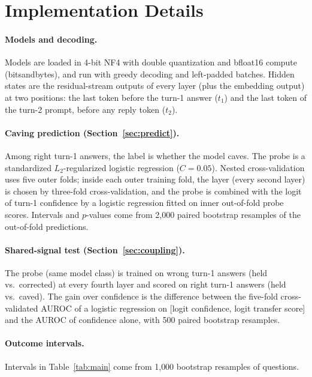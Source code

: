 \section{Implementation Details}
\label{app:impl}

\paragraph{Models and decoding.}
Models are loaded in 4-bit NF4 with double quantization and bfloat16 compute (bitsandbytes), and run with greedy decoding and left-padded batches. Hidden states are the residual-stream outputs of every layer (plus the embedding output) at two positions: the last token before the turn-1 answer ($t_1$) and the last token of the turn-2 prompt, before any reply token ($t_2$).

\paragraph{Caving prediction (Section~\ref{sec:predict}).}
Among right turn-1 answers, the label is whether the model caves. The probe is a standardized $L_2$-regularized logistic regression ($C=0.05$). Nested cross-validation uses five outer folds; inside each outer training fold, the layer (every second layer) is chosen by three-fold cross-validation, and the probe is combined with the logit of turn-1 confidence by a logistic regression fitted on inner out-of-fold probe scores. Intervals and $p$-values come from 2{,}000 paired bootstrap resamples of the out-of-fold predictions.

\paragraph{Shared-signal test (Section~\ref{sec:coupling}).}
The probe (same model class) is trained on wrong turn-1 answers (held vs.\ corrected) at every fourth layer and scored on right turn-1 answers (held vs.\ caved). The gain over confidence is the difference between the five-fold cross-validated AUROC of a logistic regression on [logit confidence, logit transfer score] and the AUROC of confidence alone, with 500 paired bootstrap resamples.

\paragraph{Outcome intervals.}
Intervals in Table~\ref{tab:main} come from 1{,}000 bootstrap resamples of questions.

